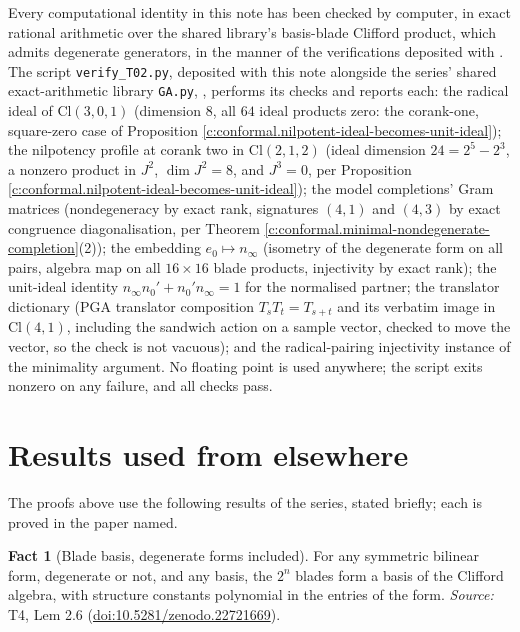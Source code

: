 \documentclass[11pt]{article}
\theoremstyle{definition}
\newtheorem{fact}[theorem]{Fact}
\theoremstyle{plain}
\providecommand{\Cl}{}\renewcommand{\Cl}{\mathrm{Cl}}
\providecommand{\nInf}{}\renewcommand{\nInf}{n_\infty}
\providecommand{\nO}{}\renewcommand{\nO}{n_0}
\begin{document}
\label{c:note.conformal.setting-machine-verification}
Every computational identity in this note has been checked by computer, in exact rational arithmetic over the shared library's basis-blade Clifford product, which admits degenerate generators, in the manner of the verifications deposited with \cite{ButlerT1, ButlerT4}. The script \texttt{verify\_T02.py}, deposited with this note alongside the series' shared exact-arithmetic library \texttt{GA.py}, \cite{ButlerVerifyT02}, performs its checks and reports each: the radical ideal of $\Cl(3,0,1)$ (dimension $8$, all $64$ ideal products zero: the corank-one, square-zero case of Proposition \ref{c:conformal.nilpotent-ideal-becomes-unit-ideal}); the nilpotency profile at corank two in $\Cl(2,1,2)$ (ideal dimension $24 = 2^5 - 2^3$, a nonzero product in $J^2$, $\dim J^2 = 8$, and $J^3 = 0$, per Proposition \ref{c:conformal.nilpotent-ideal-becomes-unit-ideal}); the model completions' Gram matrices (nondegeneracy by exact rank, signatures $(4,1)$ and $(4,3)$ by exact congruence diagonalisation, per Theorem \ref{c:conformal.minimal-nondegenerate-completion}(2)); the embedding $e_0 \mapsto \nInf$ (isometry of the degenerate form on all pairs, algebra map on all $16 \times 16$ blade products, injectivity by exact rank); the unit-ideal identity $\nInf \nO' + \nO' \nInf = 1$ for the normalised partner; the translator dictionary (PGA translator composition $T_s T_t = T_{s+t}$ and its verbatim image in $\Cl(4,1)$, including the sandwich action on a sample vector, checked to move the vector, so the check is not vacuous); and the radical-pairing injectivity instance of the minimality argument. No floating point is used anywhere; the script exits nonzero on any failure, and all checks pass.

\section{Results used from elsewhere}
The proofs above use the following results of the series, stated briefly; each is proved in the paper named.

\begin{fact}[Blade basis, degenerate forms included]\label{c:sheaf.blade-basis-degenerate-forms-included}
For any symmetric bilinear form, degenerate or not, and any basis, the $2^n$ blades form a basis of the Clifford algebra, with structure constants polynomial in the entries of the form.
\emph{Source:} T4, Lem 2.6 (\href{https://doi.org/10.5281/zenodo.22721669}{doi:10.5281/zenodo.22721669}).
\end{fact}
\end{document}

